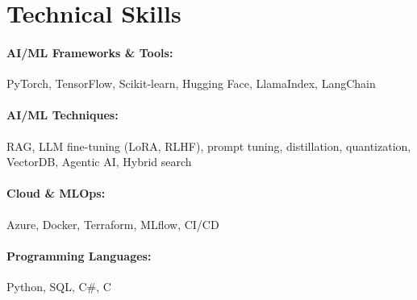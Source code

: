 \documentclass[10pt, letterpaper]{article}
\newenvironment{onecolentry}{
    \begin{adjustwidth}{
        0 cm + 0.00001 cm
    }{
        0 cm + 0.00001 cm
    }
}{
    \end{adjustwidth}
} %
\begin{document}
        




\vspace{-1mm}
\section{Technical Skills}

        \paragraph{AI/ML Frameworks \& Tools:} PyTorch, TensorFlow, Scikit-learn, Hugging Face, LlamaIndex, LangChain
        \vspace{-4mm}
        \paragraph{AI/ML Techniques:} RAG, LLM fine-tuning (LoRA, RLHF), prompt tuning, distillation, quantization, VectorDB, Agentic AI, Hybrid search
        \vspace{-4mm}
        \paragraph{Cloud \& MLOps:} Azure, Docker, Terraform, MLflow, CI/CD
        \vspace{-4mm}
        \paragraph{Programming Languages:} Python, SQL, C\#, C

    
        
\end{document}
